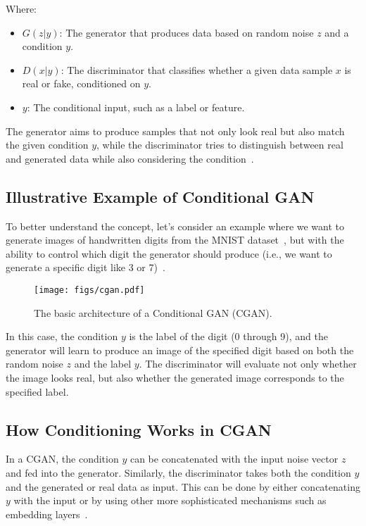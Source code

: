 Where:
\begin{itemize}
    \item \( G(z|y) \): The generator that produces data based on random noise \( z \) and a condition \( y \).
    \item \( D(x|y) \): The discriminator that classifies whether a given data sample \( x \) is real or fake, conditioned on \( y \).
    \item \( y \): The conditional input, such as a label or feature.
\end{itemize}

The generator aims to produce samples that not only look real but also match the given condition \( y \), while the discriminator tries to distinguish between real and generated data while also considering the condition~\cite{wang2018cgan, devries2019evaluation}.

\subsection{Illustrative Example of Conditional GAN}
To better understand the concept, let's consider an example where we want to generate images of handwritten digits from the MNIST dataset~\cite{deng2012mnist}, but with the ability to control which digit the generator should produce (i.e., we want to generate a specific digit like 3 or 7)~\cite{thekumparampil2018robustness}.

\begin{figure}[htbp]
    \centering
    \texttt{[image: figs/cgan.pdf]}
    \caption{The basic architecture of a Conditional GAN (CGAN).}
\end{figure}

In this case, the condition \( y \) is the label of the digit (0 through 9), and the generator will learn to produce an image of the specified digit based on both the random noise \( z \) and the label \( y \). The discriminator will evaluate not only whether the image looks real, but also whether the generated image corresponds to the specified label.

\subsection{How Conditioning Works in CGAN}
In a CGAN, the condition \( y \) can be concatenated with the input noise vector \( z \) and fed into the generator. Similarly, the discriminator takes both the condition \( y \) and the generated or real data as input. This can be done by either concatenating \( y \) with the input or by using other more sophisticated mechanisms such as embedding layers~\cite{mirza2014conditional}.

